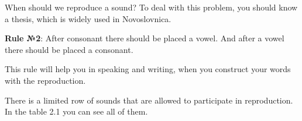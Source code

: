 When should we reproduce a sound? To deal with this problem, you should know a thesis, which is widely used in Novoslovnica.

\textbf{Rule №2}: After consonant there should be placed a vowel. And after a vowel there should be placed a consonant.

This rule will help you in speaking and writing, when you construct your words with the reproduction.

There is a limited row of sounds that are allowed to participate in reproduction. In the table 2.1 you can see all of them.




